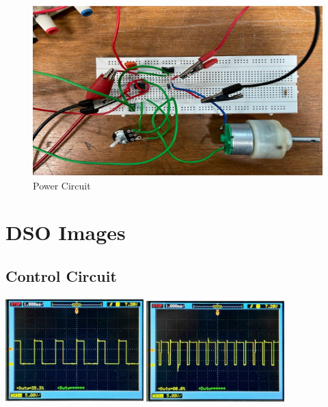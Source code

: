 \documentclass{article}
\begin{document}
\begin{figure}[h!]
    \centering
    \includegraphics[width=1\textwidth]{pic4.png}
    \caption{Power Circuit}
\end{figure}

\section{DSO Images}
\subsection{Control Circuit}
\begin{center}
    \includegraphics[width=0.4\textwidth]{pic5.png} \hspace{2mm}
    \includegraphics[width=0.4\textwidth]{pic6.png}\\
\end{center}
\end{document}
